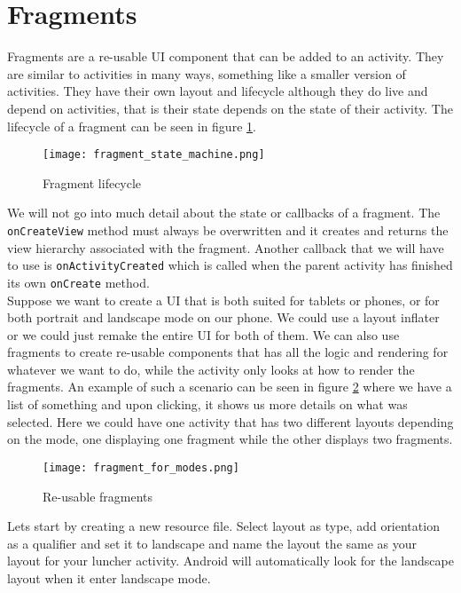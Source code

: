 \section{Fragments}
Fragments are a re-usable UI component that can be added to an activity. They are similar to activities in many ways, something like a smaller version of activities. They have their own layout and lifecycle although they do live and depend on activities, that is their state depends on the state of their activity. The lifecycle of a fragment can be seen in figure \ref{fig:flife}.

\begin{figure}[H]
\centering
\texttt{[image: fragment\_state\_machine.png]}
\caption{Fragment lifecycle}
\label{fig:flife}
\end{figure}

We will not go into much detail about the state or callbacks of a fragment. The \texttt{onCreateView} method must always be overwritten and it creates and returns the view hierarchy associated with the fragment. Another callback that we will have to use is \texttt{onActivityCreated} which is called when the parent activity has finished its own \texttt{onCreate} method.\\

Suppose we want to create a UI that is both suited for tablets or phones, or for both portrait and landscape mode on our phone. We could use a layout inflater or we could just remake the entire UI for both of them. We can also use fragments to create re-usable components that has all the logic and rendering for whatever we want to do, while the activity only looks at how to render the fragments. An example of such a scenario can be seen in figure \ref{fig:freuse} where we have a list of something and upon clicking, it shows us more details on what was selected. Here we could have one activity that has two different layouts depending on the mode, one displaying one fragment while the other displays two fragments.

\begin{figure}[H]
\centering
\texttt{[image: fragment\_for\_modes.png]}
\caption{Re-usable fragments}
\label{fig:freuse}
\end{figure}

Lets start by creating a new resource file. Select layout as type, add orientation as a qualifier and set it to landscape and name the layout the same as your layout for your luncher activity. Android will automatically look for the landscape layout when it enter landscape mode.\\

